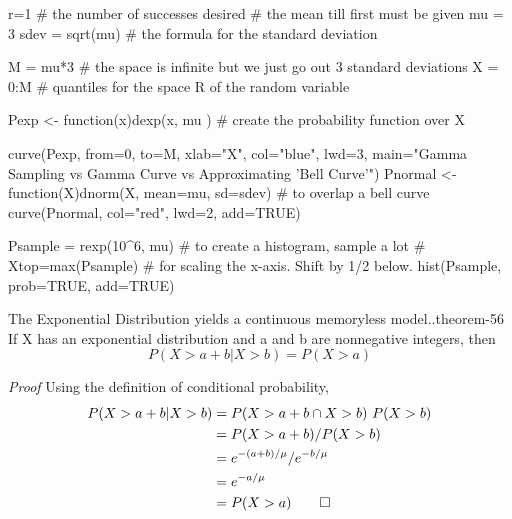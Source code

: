 \documentclass[10pt,]{book}
\makeatletter
\renewcommand*{\proofname}{Proof}
\renewenvironment{proof}[1][\proofname]{\par
  \pushQED{\qed}%
  \normalfont \topsep6\p@\@plus6\p@\relax
  \trivlist
  \item\relax
    {\itshape
    #1\@addpunct{.}}\hspace\labelsep\ignorespaces
}{%
  \popQED\endtrivlist\@endpefalse
}
\numberwithin{equation}{section}
\makeatother
\begin{document}
\begin{sageinput}
r=1                # the number of successes desired
            # the mean till first must be given
mu = 3
sdev = sqrt(mu)  # the formula for the standard deviation

M = mu*3   # the space is infinite but we just go out 3 standard deviations
X = 0:M    # quantiles for the space R of the random variable 

Pexp <- function(x){dexp(x, mu )}  # create the probability function over X

curve(Pexp, from=0, to=M, xlab="X", col="blue", lwd=3,
 main="Gamma Sampling vs Gamma Curve vs Approximating 'Bell Curve'") 
Pnormal <- function(X){dnorm(X, mean=mu, sd=sdev)}   # to overlap a bell curve
curve(Pnormal, col="red", lwd=2, add=TRUE) 

Psample = rexp(10^6, mu)  # to create a histogram, sample a lot
# Xtop=max(Psample)          # for scaling the x-axis. Shift by 1/2 below.
hist(Psample, prob=TRUE, add=TRUE)
\end{sageinput}
%
\par
\hypertarget{p-1103}{}%
\begin{theorem}{The Exponential Distribution yields a continuous memoryless model..}{}{theorem-56}%
\hypertarget{p-1104}{}%
If X has an exponential distribution and a and b are nonnegative integers, then%
\begin{equation*}
P( X > a + b | X > b ) = P( X > a)
\end{equation*}
%
\end{theorem}
\begin{proof}\hypertarget{proof-59}{}
\hypertarget{p-1105}{}%
Using the definition of conditional probability,%
\begin{align*}
P( X > a + b | X > b ) & = P( X > a + b \cap X > b ) \ P( X > b)\\
& = P( X > a + b ) / P( X > b)\\
& = e^{-(a+b)/ \mu} / e^{-b / \mu}\\
& = e^{-a/ \mu}\\
& = P(X > a)\qedhere
\end{align*}
%
\end{proof}
%
\par
\hypertarget{p-1106}{}%
\end{document}
